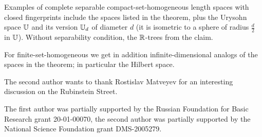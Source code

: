 \documentclass[a4paper,10pt]{article}
\begin{document}
Examples of complete separable compact-set-homogeneous length spaces with closed fingerprints include the spaces listed in the theorem,
plus the Urysohn space $\mathbb{U}$ and its version $\mathbb{U}_d$ of diameter $d$ (it is isometric to a sphere of radius $\tfrac d2$ in $\mathbb{U}$).
Without separability condition, the $\mathbb{R}$-trees from the claim.

For finite-set-homogeneous we get in addition infinite-dimensional analogs of the spaces in the theorem;
in particular the Hilbert space.

The second author wants to thank Rostislav Matveyev for an interesting discussion on the Rubinstein Street. 

The first author was partially supported by the Russian Foundation for Basic Research grant 20-01-00070, 
the second author was partially supported by the National Science Foundation grant DMS-2005279.

{\sloppy
\printbibliography[heading=bibintoc]
\fussy
}
\end{document}
